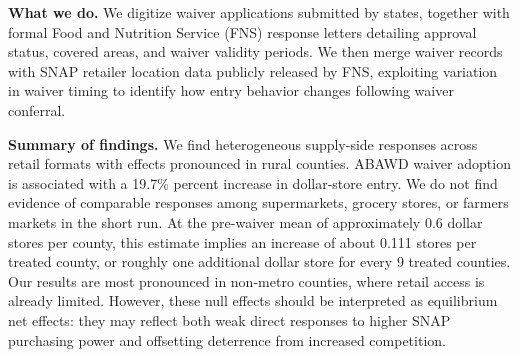 \documentclass[12pt]{article}
\begin{document}
\textbf{What we do.} We digitize waiver applications submitted by states, together with formal Food and Nutrition Service (FNS) response letters detailing approval status, covered areas, and waiver validity periods. We then merge waiver records with SNAP retailer location data publicly released by FNS, exploiting variation in waiver timing to identify how entry behavior changes following waiver conferral. 

\textbf{Summary of findings.} We find heterogeneous supply-side responses across retail formats with effects pronounced in rural counties. ABAWD waiver adoption is associated with a 19.7\% percent increase in dollar-store entry.  We do not find evidence of comparable responses among supermarkets, grocery stores, or farmers markets in the short run. At the pre-waiver mean of approximately 0.6 dollar stores per county, this estimate implies an increase of about 0.111 stores per treated county, or roughly one additional dollar store for every 9 treated counties. Our results are most pronounced in non-metro counties, where retail access is already limited. However, these null effects should be interpreted as equilibrium net effects: they may reflect both weak direct responses to higher SNAP purchasing power and offsetting deterrence from increased competition.



\end{document}
